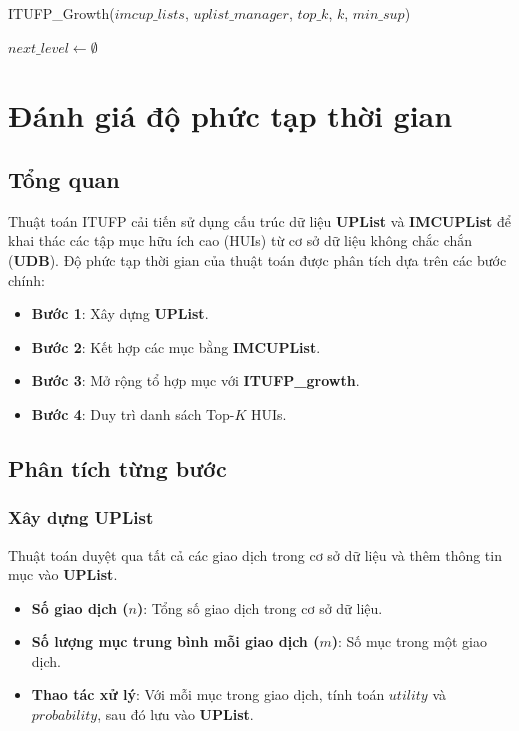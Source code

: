 \documentclass[conference]{IEEEtran}
\begin{document}
\begin{algorithm}[H]
\caption{ITUFP\_Growth($imcup\_lists$, $uplist\_manager$, $top\_k$, $k$, $min\_sup$)}
$next\_level \gets \emptyset$\;
\end{algorithm}

\section{Đánh giá độ phức tạp thời gian}
\label{sec:time_complexity}

\subsection{Tổng quan}
Thuật toán ITUFP cải tiến sử dụng cấu trúc dữ liệu \textbf{UPList} và \textbf{IMCUPList} để khai thác các tập mục hữu ích cao (HUIs) từ cơ sở dữ liệu không chắc chắn (\textbf{UDB}). Độ phức tạp thời gian của thuật toán được phân tích dựa trên các bước chính:
\begin{itemize}
    \item \textbf{Bước 1}: Xây dựng \textbf{UPList}.
    \item \textbf{Bước 2}: Kết hợp các mục bằng \textbf{IMCUPList}.
    \item \textbf{Bước 3}: Mở rộng tổ hợp mục với \textbf{ITUFP\_growth}.
    \item \textbf{Bước 4}: Duy trì danh sách Top-\(K\) HUIs.
\end{itemize}

\subsection{Phân tích từng bước}

\subsubsection{Xây dựng \textbf{UPList}}
Thuật toán duyệt qua tất cả các giao dịch trong cơ sở dữ liệu và thêm thông tin mục vào \textbf{UPList}.
\begin{itemize}
    \item \textbf{Số giao dịch (\(n\))}: Tổng số giao dịch trong cơ sở dữ liệu.
    \item \textbf{Số lượng mục trung bình mỗi giao dịch (\(m\))}: Số mục trong một giao dịch.
    \item \textbf{Thao tác xử lý}: Với mỗi mục trong giao dịch, tính toán \(utility\) và \(probability\), sau đó lưu vào \textbf{UPList}.
\end{itemize}
\end{document}
